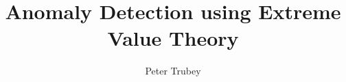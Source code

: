 \documentclass{article}
\title{Anomaly Detection using Extreme Value Theory}
\author{Peter Trubey}
\date{}
\begin{document}
\maketitle
\begin{abstract}
  \lipsum[1-4]
\end{abstract}

\newpage

\tableofcontents

\newpage









\newpage



\end{document}
